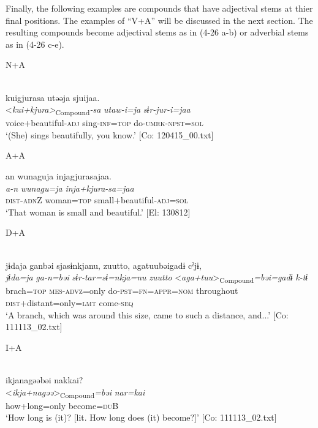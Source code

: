   Finally, the following examples are compounds that have adjectival stems at thier final positions. The examples of “V+A” will be discussed in the next section. The resulting compounds become adjectival stems as in (4-26 a-b) or adverbial stems as in (4-26 c-e).

\ea 
\exi{} N+A \label{ex:4.26}

\ea{}\\
\glll    kuigjurasa  utəəja  sjuijaa.\\
      <\textit{kui+kjura>}\textsubscript{Compound}\textit{{}-sa}  \textit{utaw-i=ja}  \textit{sɨr-jur-i=jaa}\\
      voice+beautiful-\textsc{adj}  sing-\textsc{inf}=\textsc{top}  do-\textsc{umrk}-\textsc{npst}=\textsc{sol}\\
      \glt       ‘(She) sings beautifully, you know.’ [Co: 120415\_00.txt]

\exi{} A+A

\ex\label{ex:4.26b}  
     \glll  an  wunaguja  injagjurasajaa.\\
      \textit{a-n}  \textit{wunagu=ja}  \textit{inja+kjura-sa=jaa}\\
      \textsc{dist}-\textsc{adn}Z  woman=\textsc{top}  small+beautiful-\textsc{adj}=\textsc{sol}\\
      \glt       ‘That woman is small and beautiful.’ [El: 130812]

\exi{} D+A

\ex{}\\\label{ex:4.26c}
\glll     jɨdaja  ganbəi  sjasɨnkjanu,  {\textbar}zuutto{\textbar},   agatuubəigadɨ  cˀjɨ,\\
      \textit{jɨda=ja}  \textit{ga-n=bəi}  \textit{sɨr-tar=sɨ=nkja=nu}  \textit{zuutto}     <\textit{aga+tuu}>\textsubscript{Compound}\textit{=bəi=gadɨ}  \textit{k-tɨ}\\
      brach=\textsc{top}  \textsc{mes}-\textsc{advz}=only  do-\textsc{pst}=\textsc{fn}=\textsc{appr}=\textsc{nom}  throughout   \textsc{dist}+distant=only=\textsc{lmt}  come-\textsc{seq}     \\
    \glt       ‘A branch, which was around this size, came to such a distance, and...’ [Co: 111113\_02.txt]

\exi{}  I+A

\ex{}\\\label{ex:4.26d}
\glll     ikjanagəəbəi  nakkai?\\
      <\textit{ikja+nagəə}>\textsubscript{Compound}\textit{=bəi}  \textit{nar=kai}\\
      how+long=only  become=\textsc{du}B\\
    \glt       ‘How long is (it)? [lit. How long does (it) become?]’ [Co: 111113\_02.txt]

